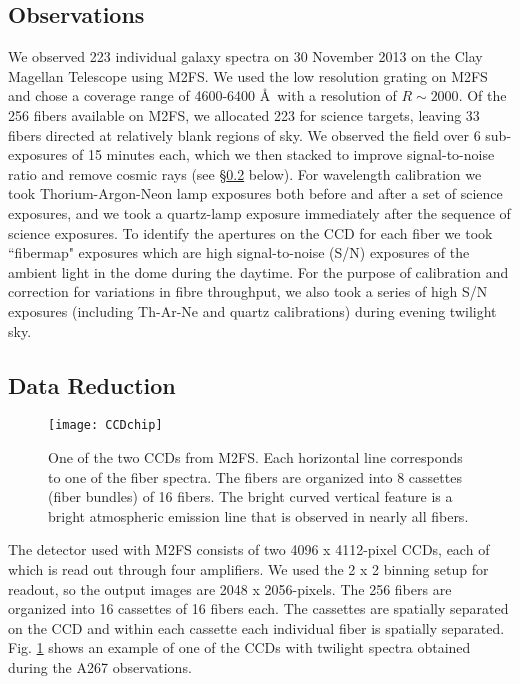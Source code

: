 \documentclass[twocolumn]{aastex6}
\begin{document}
\subsection{Observations}
We observed 223 individual galaxy spectra on 30 November 2013 on the Clay Magellan Telescope using M2FS.
We used the low resolution grating on M2FS and chose a coverage range of 4600-6400 \AA\ with a resolution of $R\sim2000$.
Of the 256 fibers available on M2FS, we allocated 223 for science targets, leaving 33 fibers directed at relatively blank regions of sky.
We observed the field over 6 sub-exposures of 15 minutes each, which we then stacked to improve signal-to-noise ratio and remove cosmic rays (see \S\ref{data reduction} below).
For wavelength calibration we took Thorium-Argon-Neon lamp exposures both before and after a set of science exposures, and we took a quartz-lamp exposure immediately after the sequence of science exposures.
To identify the apertures on the CCD for each fiber we took ``fibermap" exposures which are high signal-to-noise (S/N) exposures of the ambient light in the dome during the daytime.
For the purpose of calibration and correction for variations in fibre throughput, we also took a series of high S/N exposures (including Th-Ar-Ne and quartz calibrations) during evening twilight sky.

\subsection{Data Reduction}
\label{data reduction}
\begin{figure}
\centering
\texttt{[image: CCDchip]}
\caption{One of the two CCDs from M2FS.  Each horizontal line corresponds to one of the fiber spectra.  The fibers are organized into 8 cassettes (fiber bundles) of 16 fibers.  The bright curved vertical feature is a bright atmospheric emission line that is observed in nearly all fibers.}
\label{ccd chip}
\end{figure}

The detector used with M2FS consists of two 4096 x 4112-pixel CCDs, each of which is read out through four amplifiers.
We used the 2 x 2 binning setup for readout, so the output images are 2048 x 2056-pixels.
The 256 fibers are organized into 16 cassettes of 16 fibers each.
The cassettes are spatially separated on the CCD and within each cassette each individual fiber is spatially separated.
Fig. \ref{ccd chip} shows an example of one of the CCDs with twilight spectra obtained during the A267 observations.
\end{document}
